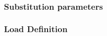 %
\subsubsection{Substitution parameters}\label{section:substitution}


\subsubsection{Load Definition}\label{section:workload}

